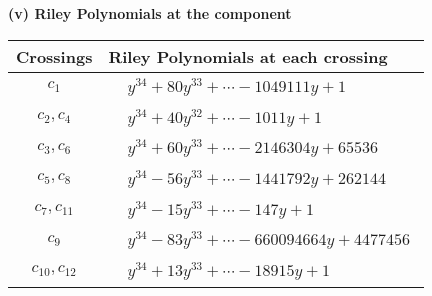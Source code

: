 \documentclass[1p]{elsarticle_modified}
\theoremstyle{definition}
\begin{document}
\newpage\renewcommand{\arraystretch}{1}
\flushleft \textbf{(v) Riley Polynomials at the component}\newline \\
\begin{tabular}{m{50pt}|m{274pt}}
Crossings & \hspace{64pt}Riley Polynomials at each crossing \\
\hline $$\begin{aligned}c_{1}\end{aligned}$$&$\begin{aligned}
&y^{34}+80 y^{33}+\cdots-1049111 y+1
\end{aligned}$\\
\hline $$\begin{aligned}c_{2},c_{4}\end{aligned}$$&$\begin{aligned}
&y^{34}+40 y^{32}+\cdots-1011 y+1
\end{aligned}$\\
\hline $$\begin{aligned}c_{3},c_{6}\end{aligned}$$&$\begin{aligned}
&y^{34}+60 y^{33}+\cdots-2146304 y+65536
\end{aligned}$\\
\hline $$\begin{aligned}c_{5},c_{8}\end{aligned}$$&$\begin{aligned}
&y^{34}-56 y^{33}+\cdots-1441792 y+262144
\end{aligned}$\\
\hline $$\begin{aligned}c_{7},c_{11}\end{aligned}$$&$\begin{aligned}
&y^{34}-15 y^{33}+\cdots-147 y+1
\end{aligned}$\\
\hline $$\begin{aligned}c_{9}\end{aligned}$$&$\begin{aligned}
&y^{34}-83 y^{33}+\cdots-660094664 y+4477456
\end{aligned}$\\
\hline $$\begin{aligned}c_{10},c_{12}\end{aligned}$$&$\begin{aligned}
&y^{34}+13 y^{33}+\cdots-18915 y+1
\end{aligned}$\\
\hline
\end{tabular}\\~\\
\end{document}
